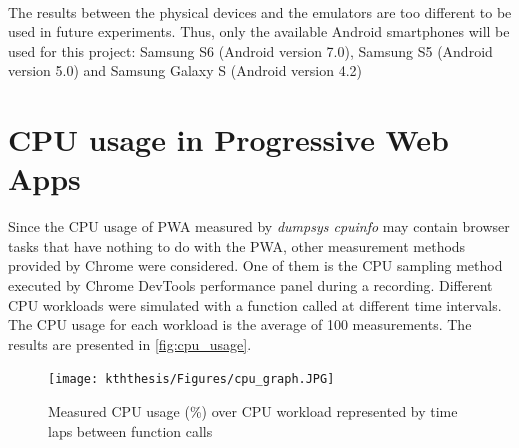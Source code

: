 \documentclass{kththesis}
\begin{document}
\begin{table}[!ht]

    \caption{Emulators Tests}
    \label{tab:emulators_test}
\end{table}

\paragraph{}
The results between the physical devices and the emulators are too different to be used in future experiments. Thus, only the available Android smartphones will be used for this project: Samsung S6 (Android version 7.0), Samsung S5 (Android version 5.0) and Samsung Galaxy S (Android version 4.2)


\section{CPU usage in Progressive Web Apps}
\label{results:cpu}
Since the CPU usage of PWA measured by \textit{dumpsys cpuinfo} may contain browser tasks that have nothing to do with the PWA, other measurement methods provided by Chrome were considered. One of them is the CPU sampling method executed by Chrome DevTools performance panel during a recording. 
Different CPU workloads were simulated with a function called at different time intervals. The CPU usage for each workload is the average of 100 measurements. The results are presented in \autoref{fig:cpu_usage}.

\begin{figure}
    \centering
    \texttt{[image: kththesis/Figures/cpu\_graph.JPG]}
    \caption[Measurements of CPU Usage of PWA]{Measured CPU usage (\%) over CPU workload represented by time laps between function calls}
    \label{fig:cpu_usage}
\end{figure}
\end{document}
